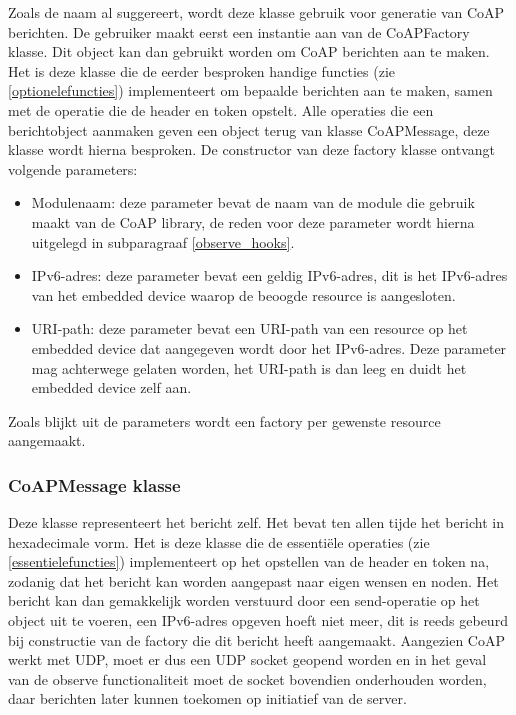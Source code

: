 Zoals de naam al suggereert, wordt deze klasse gebruik voor generatie van CoAP berichten. De gebruiker maakt eerst een instantie aan van de CoAPFactory klasse. Dit object kan dan gebruikt worden om CoAP berichten aan te maken. Het is deze klasse die de eerder besproken handige functies (zie \ref{optionelefuncties}) implementeert om bepaalde berichten aan te maken, samen met de operatie die de header en token opstelt. Alle operaties die een berichtobject aanmaken geven een object terug van klasse CoAPMessage, deze klasse wordt hierna besproken. De constructor van deze factory klasse ontvangt volgende parameters:
\begin{itemize}
\item Modulenaam: deze parameter bevat de naam van de module die gebruik maakt van de CoAP library, de reden voor deze parameter wordt hierna uitgelegd in subparagraaf \ref{observe_hooks}.
\item IPv6-adres: deze parameter bevat een geldig IPv6-adres, dit is het IPv6-adres van het embedded device waarop de beoogde resource is aangesloten.
\item URI-path: deze parameter bevat een URI-path van een resource op het embedded device dat aangegeven wordt door het IPv6-adres. Deze parameter mag achterwege gelaten worden, het URI-path is dan leeg en duidt het embedded device zelf aan.
\end{itemize}
Zoals blijkt uit de parameters wordt een factory per gewenste resource aangemaakt.

\subsubsection{CoAPMessage klasse}

Deze klasse representeert het bericht zelf. Het bevat ten allen tijde het bericht in hexadecimale vorm. Het is deze klasse die de essenti\"{e}le operaties (zie \ref{essentielefuncties}) implementeert op het opstellen van de header en token na, zodanig dat het bericht kan worden aangepast naar eigen wensen en noden. Het bericht kan dan gemakkelijk worden verstuurd door een send-operatie op het object uit te voeren, een IPv6-adres opgeven hoeft niet meer, dit is reeds gebeurd bij constructie van de factory die dit bericht heeft aangemaakt. Aangezien CoAP werkt met UDP, moet er dus een UDP socket geopend worden en in het geval van de observe functionaliteit moet de socket bovendien onderhouden worden, daar berichten later kunnen toekomen op initiatief van de server.

